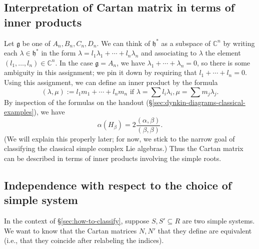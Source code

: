 \documentclass[reqno]{amsart} 
\begin{document}
\subsection{Interpretation of Cartan matrix in terms of inner products\label{sec:cartan-via-inner-products}}
\label{sec:org8b90669}
Let $\mathfrak{g}$ be one of $A_n, B_n, C_n, D_n$.  We can think of $\mathfrak{h}^*$ as a subspace of $\mathbb{C}^n$ by writing each $\lambda \in \mathfrak{h}^*$ in the form $\lambda = l_1 \lambda_1 + \dotsb + l_n \lambda_n$ and associating to $\lambda$ the element $(l_1,\dotsc,l_n) \in \mathbb{C}^n$.  In the case $\mathfrak{g} = A_n$, we have $\lambda_1 + \dotsb + \lambda_n = 0$, so there is some ambiguity in this assignment; we pin it down by requiring that $l_1 + \dotsb + l_n = 0$.  Using this assignment, we can define an inner product by the formula
\begin{equation*}
  (\lambda,\mu) := l_1 m_1 + \dotsb + l_n m_n \text{ if } \lambda = \sum l_i \lambda_i, \mu = \sum m_j \lambda_j.
\end{equation*}
By inspection of the formulas on the handout (\S\ref{sec:dynkin-diagrams-classical-examples}), we have
\begin{equation*}
  \alpha(H_\beta) = 2 \frac{(\alpha,\beta)}{(\beta,\beta)}.
\end{equation*}
(We will explain this properly later; for now, we stick to the narrow goal of classifying the classical simple complex Lie algebras.)  Thus the Cartan matrix can be described in terms of inner products involving the simple roots.

\subsection{Independence with respect to the choice of simple system}
\label{sec:orgecfb737}
In the context of \S\ref{sec:how-to-classify}, suppose $S, S' \subseteq R$ are two simple systems.  We want to know that the Cartan matrices $N, N'$ that they define are equivalent (i.e., that they coincide after relabeling the indices).
\end{document}
